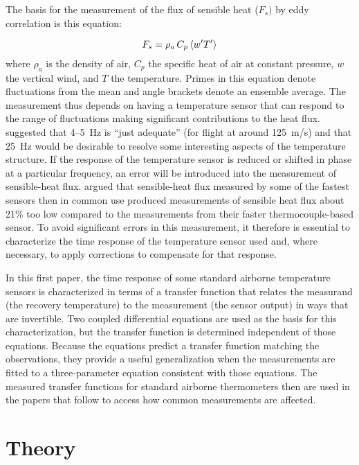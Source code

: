 \documentclass[11pt,twoside,american,12pt,twoside,american]{article}\usepackage[]{graphicx}\usepackage[]{color}
\let\stdsection\section
\renewcommand{\section}{\newpage\stdsection}
\begin{document}
The basis for the measurement of the flux of sensible heat ($F_{s})$
by eddy correlation is this equation:

\begin{equation}
F_{s}=\rho_{a}\thinspace C_{p}\left\langle w^{\prime}T^{\prime}\right\rangle \label{eq:heatFlux}
\end{equation}
where $\rho_{a}$ is the density of air, $C_{p}$ the specific heat
of air at constant pressure, $w$ the vertical wind, and $T$ the
temperature. Primes in this equation denote fluctuations from the
mean and angle brackets denote an ensemble average. The measurement
thus depends on having a temperature sensor that can respond to the
range of fluctuations making significant contributions to the heat
flux. \citet{FrieheKhelif1992} suggested that 4--5~Hz is ``just
adequate'' (for flight at around 125~m/s) and that 25~Hz would
be desirable to resolve some interesting aspects of the temperature
structure. If the response of the temperature sensor is reduced or
shifted in phase at a particular frequency, an error will be introduced
into the measurement of sensible-heat flux. \citet{LawsonRodi1992}
argued that sensible-heat flux measured by some of the fastest sensors
then in common use produced measurements of sensible heat flux about
21\% too low compared to the measurements from their faster thermocouple-based
sensor. To avoid significant errors in this measurement, it therefore
is essential to characterize the time response of the temperature
sensor used and, where necessary, to apply corrections to compensate
for that response.

In this first paper, the time response of some standard airborne temperature
sensors is characterized in terms of a transfer function that relates
the measurand (the recovery temperature) to the measurement (the sensor
output) in ways that are invertible. Two coupled differential equations
are used as the basis for this characterization, but the transfer
function is determined independent of those equations. Because the
equations predict a transfer function matching the observations, they
provide a useful generalization when the measurements are fitted to
a three-parameter equation consistent with those equations. The measured
transfer functions for standard airborne thermometers then are used
in the papers that follow to access how common measurements are affected.





\section{Theory}
\end{document}
